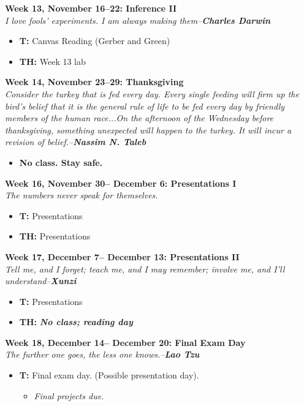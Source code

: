 \documentclass[11pt]{article}
\begin{document}
\textbf{Week 13, November 16--22: Inference II}
\\
\textit{I love fools' experiments. I am always making them--\textbf{Charles Darwin}}
\begin{itemize}
\item \textbf{T:} Canvas Reading (Gerber and Green) 
\item \textbf{TH:} Week 13 lab
\end{itemize}
\vspace{1em}
\textbf{Week 14, November 23--29: Thanksgiving}
\\
\textit{Consider the turkey that is fed every day. Every single feeding will firm up the bird's belief that it is the general rule of life to be fed every day by friendly members of the human race...On the afternoon of the Wednesday before thanksgiving, something \textit{unexpected} will happen to the turkey. It will incur a revision of belief.--\textbf{Nassim N. Taleb}}
\begin{itemize}
\item \textbf{No class. Stay safe.}
\end{itemize}
\vspace{1em}
\textbf{Week 16, November 30-- December 6: Presentations I}
\\
\textit{The numbers never speak for themselves.}
\begin{itemize}
\item \textbf{T:} Presentations 
\item \textbf{TH:} Presentations
\end{itemize}
\vspace{1em}
\textbf{Week 17, December 7-- December 13: Presentations II}
\\
\textit{Tell me, and I forget; teach me, and I may remember; involve me, and I'll understand--\textbf{Xunzi}}
\begin{itemize}
\item \textbf{T:} Presentations
\item \textbf{TH:} \textit{\textbf{No class; reading day}}
\end{itemize}
\vspace{1em}
\textbf{Week 18, December 14-- December 20: Final Exam Day}
\\
\textit{The further one goes, the less one knows.--\textbf{Lao Tzu}}
\begin{itemize}
\item \textbf{T:} Final exam day. (Possible presentation day).
\begin{itemize}
\item \textit{Final projects due.}
\end{itemize}
\end{itemize}
\end{document}
